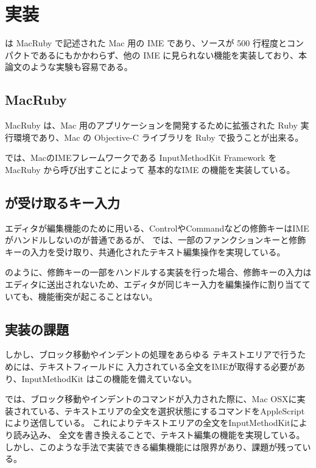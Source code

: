 \section{実装}
{\system} は MacRuby で記述された Mac 用の IME であり、ソースが 500 行程度とコンパクトであるにもかかわらず、他の IME に見られない機能を実装しており、本論文のような実験も容易である。

\subsection{MacRuby}

MacRuby は、Mac 用のアプリケーションを開発するために拡張された Ruby 実
行環境であり、Mac の Objective-C ライブラリを Ruby で扱うことが出来る。

{\system} では、MacのIMEフレームワークである
InputMethodKit Framework を MacRuby から呼び出すことによって
基本的なIME の機能を実装している。

\subsection{{\system}が受け取るキー入力}
エディタが編集機能のために用いる、ControlやCommandなどの修飾キーはIMEがハンドルしないのが普通であるが、
{\system}では、一部のファンクションキーと修飾キーの入力を受け取り、共通化されたテキスト編集操作を実現している。

{\system} のように、修飾キーの一部をハンドルする実装を行った場合、修飾キーの入力はエディタに送出されないため、エディタが同じキー入力を編集操作に割り当てていても、機能衝突が起こることはない。

\subsection{実装の課題}
しかし、ブロック移動やインデントの処理をあらゆる テキストエリアで行うためには、テキストフィールドに 入力されている全文をIMEが取得する必要があり、InputMethodKit はこの機能を備えていない。

{\system} では、ブロック移動やインデントのコマンドが入力された際に、Mac OSXに実装されている、テキストエリアの全文を選択状態にするコマンドをAppleScriptにより送信している。
これによりテキストエリアの全文をInputMethodKitにより読み込み、
全文を書き換えることで、テキスト編集の機能を実現している。
しかし、このような手法で実装できる編集機能には限界があり、課題が残っている。
